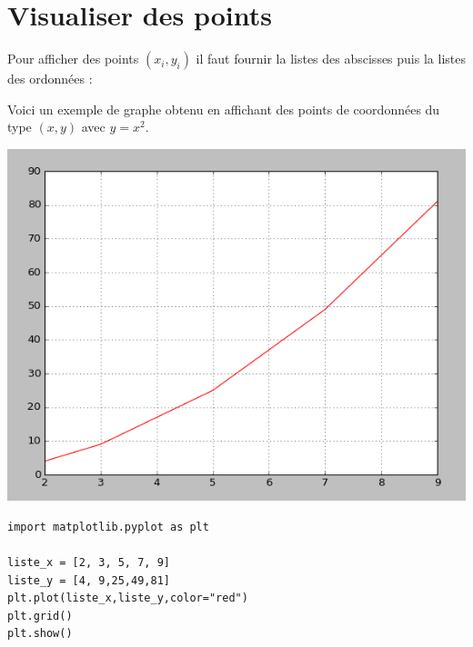\documentclass[12pt,class=report,crop=false]{standalone}
\begin{document}
\newpage

\section*{Visualiser des points}

Pour afficher des points $(x_i,y_i)$ il faut fournir la listes des abscisses puis la listes des ordonnées :\\
\centerline{}
Voici un exemple de graphe obtenu en affichant des points de coordonnées du type $(x,y)$ avec $y = x^2$.

\begin{center}
\includegraphics[scale=0.45]{ecran-liste-cours-visualisation-bis}
\end{center}


\begin{lstlisting}
import matplotlib.pyplot as plt

liste_x = [2, 3, 5, 7, 9]
liste_y = [4, 9,25,49,81]
plt.plot(liste_x,liste_y,color="red")
plt.grid()
plt.show()
\end{lstlisting}
\end{document}
